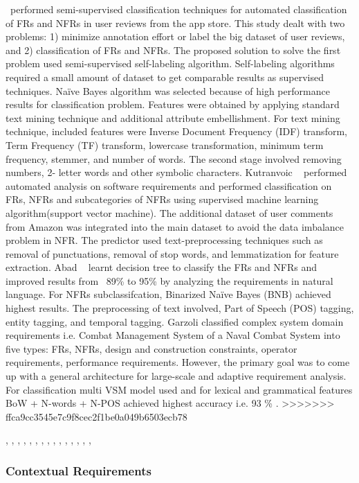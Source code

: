 \etal~\cite{Deocadez:2017}performed semi-supervised classification techniques
for automated classification of FRs and NFRs in user reviews from the app store.
This study dealt with two problems: 1) minimize annotation effort or label the
big dataset of user reviews, and 2) classification of FRs and NFRs. The proposed
solution to solve the first problem used semi-supervised self-labeling
algorithm. Self-labeling algorithms required a small amount of dataset to get
comparable results as supervised techniques. Naïve Bayes algorithm was selected
because of high performance results for classification problem. Features were
obtained by applying standard text mining technique and additional attribute
embellishment. For text mining technique, included features were Inverse
Document Frequency (IDF) transform, Term Frequency (TF) transform, lowercase
transformation, minimum term frequency, stemmer, and number of words. The second
stage involved removing numbers, 2- letter words and other symbolic characters.
Kutranvoic \etal ~ \cite {Kurtanovic:2017}performed automated analysis on
software requirements and performed classification on FRs, NFRs and
subcategories of NFRs using supervised machine learning algorithm(support vector
machine). The additional dataset of user comments from Amazon was integrated
into the main dataset to avoid the data imbalance problem in NFR. The predictor
used text-preprocessing techniques such as removal of punctuations, removal of
stop words, and lemmatization for feature extraction. Abad \etal ~
\cite{Abad:2017} learnt decision tree to classify the FRs and NFRs and improved
results from ~89\% to 95\% by analyzing the requirements in natural language.
For NFRs subclassifcation, Binarized Naïve Bayes (BNB) achieved highest results.
The preprocessing of text involved, Part of Speech (POS) tagging, entity
tagging, and temporal tagging. Garzoli \cite {Garzoli:2013} classified complex
system domain requirements i.e. Combat Management System of a Naval Combat
System into five types: FRs, NFRs, design and construction constraints, operator
requirements, performance requirements. However, the primary goal was to come up
with a general architecture for large-scale and adaptive requirement analysis.
For classification multi VSM model used and for lexical and grammatical features
BoW + N-words + N-POS achieved highest accuracy i.e. 93 \% .
>>>>>>> ffca9cc3545e7c9f8cec2f1be0a049b6503ecb78



\cite{Deocadez:2017}, \cite{Kurtanovic:2017}, \cite{Guzman:2017},
\cite{Abad:2017}, \cite{Dekhtyar:2017}, \cite{Rashwan:2012}, \cite{Lu:2017},
\cite{Hayes:2014}, \cite{Williams:2017}, \cite{Garzoli:2013},
\cite{Casamayor:2010}, \cite{Wang:2016}, \cite{Hussain:2012}, \cite{Jiang:2014},
\cite{Jha:2017}, \cite{Pinquie:2015}



\subsubsection{Contextual Requirements} 

